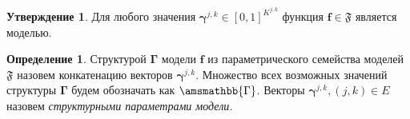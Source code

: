 \documentclass[11pt, a5paper]{dissert}
\theoremstyle{definition}
\newtheorem{defin}{Определение}
\newtheorem{utv}{Утверждение}
\begin{document}

\begin{utv}
Для любого значения $\boldsymbol{\gamma}^{j,k} \in [0,1]^{K^{j,k}}$ функция $\mathbf{f} \in \mathfrak{F}$ является моделью.
\end{utv}






\begin{defin}
Структурой $\boldsymbol{\Gamma}$  модели $\mathbf{f}$ из параметрического семейства моделей $\mathfrak{F}$  назовем конкатенацию векторов $\boldsymbol{\gamma}^{j,k}$. Множество всех возможных значений структуры $\boldsymbol{\Gamma}$ будем обозначать как $\amsmathbb{\Gamma}$.
Векторы $\boldsymbol{\gamma}^{j,k}, (j,k) \in E$ назовем \textit{структурными параметрами модели.}
\end{defin}

\end{document}
